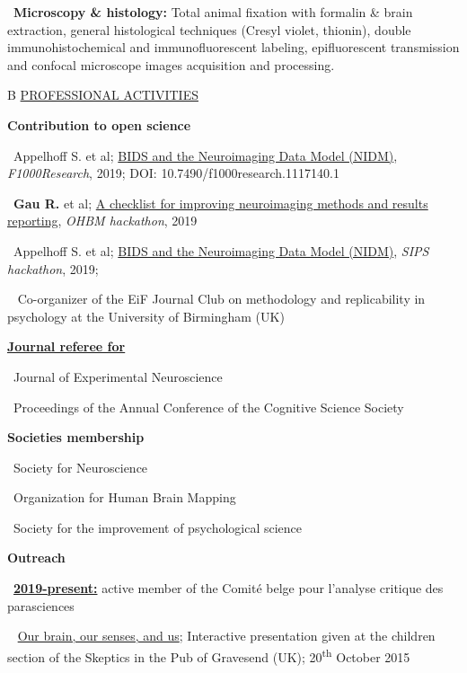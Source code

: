\documentclass[a4paper,12pt,oneside]{letter}
\begin{document}
{\textbullet~\textbf{Microscopy \& histology:} Total animal fixation with formalin \& brain extraction, general histological techniques (Cresyl violet, thionin), double immunohistochemical and immunofluorescent labeling, epifluorescent transmission and confocal microscope images acquisition and processing.


\medskip 

\begin{tabular}{B}
 \underline{PROFESSIONAL ACTIVITIES}
\end{tabular}


\textbf{Contribution to open science}

\textbullet~Appelhoff S. et al; 
\href{https://f1000research.com/documents/8-1329}{BIDS and the Neuroimaging Data Model (NIDM)}, \textit{F1000Research}, 2019; DOI: 10.7490/f1000research.1117140.1

\textbullet~\textbf{Gau R.} et al; 
\href{https://github.com/ohbm/hackathon2019/issues/49}{A checklist for improving neuroimaging methods and results reporting}, \textit{OHBM hackathon}, 2019

\textbullet~Appelhoff S. et al; 
\href{https://f1000research.com/documents/8-1329}{BIDS and the Neuroimaging Data Model (NIDM)}, \textit{SIPS hackathon}, 2019;

\textbullet~ Co-organizer of the EiF Journal Club on methodology and replicability in psychology at the University of Birmingham (UK)


\href{http://publons.com/author/1205193/remi-gau#profile}{\textbf{Journal referee for}}

\textbullet~Journal of Experimental Neuroscience

\textbullet~Proceedings of the Annual Conference of the Cognitive Science Society


\textbf{Societies membership}

\textbullet~Society for Neuroscience

\textbullet~Organization for Human Brain Mapping

\textbullet~Society for the improvement of psychological science


\textbf{Outreach}


\textbullet~\underline{\textbf{2019-present:}} active member of the Comité belge pour l'analyse critique des parasciences

\textbullet~ \href{https://dx.doi.org/10.6084/m9.figshare.4535423.v1}{Our brain, our senses, and us}; Interactive presentation given at the children section of the Skeptics in the Pub of Gravesend (UK); 20\textsuperscript{th} October 2015


}
\end{document}
